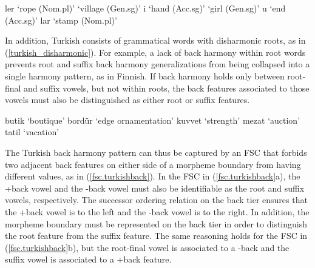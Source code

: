 \documentclass[,doc,floatsintext]{apa6}
\theoremstyle{definition}
\theoremstyle{definition}
\theoremstyle{definition}
\theoremstyle{remark}
\begin{document}
\begin{exe}
\label{turkish_back} 
\begin{xlist}
  \ex {}ler `rope (Nom.pl)'
  \ex {} `village (Gen.sg)'
  \ex {}i   `hand (Acc.sg)'
  \ex {} `girl (Gen.sg)'
  \ex {}u  `end (Acc.sg)'
  \ex {}lar `stamp (Nom.pl)'
\end{xlist}
\end{exe}

In addition, Turkish consists of grammatical words with disharmonic
roots, as in (\ref{turkish_disharmonic}). For example, a lack of back
harmony within root words prevents root and suffix back harmony
generalizations from being collapsed into a single harmony pattern, as
in Finnish. If back harmony holds only between root-final and suffix
vowels, but not within roots, the back features associated to those
vowels must also be distinguished as either root or suffix features.

\begin{exe}
\label{turkish_disharmonic} 
\begin{xlist}
  \ex butik   `boutique'
  \ex bordür  `edge ornamentation'
  \ex kuvvet  `strength'
  \ex mezat   `auction'
  \ex tatil   `vacation'
\end{xlist}
\end{exe}

The Turkish back harmony pattern can thus be captured by an FSC that
forbids two adjacent back features on either side of a morpheme boundary
from having different values, as in (\ref{fsc.turkishback}). In the FSC
in (\ref{fsc.turkishback}a), the +back vowel and the -back vowel must
also be identifiable as the root and suffix vowels, respectively. The
successor ordering relation on the back tier ensures that the +back
vowel is to the left and the -back vowel is to the right. In addition,
the morpheme boundary must be represented on the back tier in order to
distinguish the root feature from the suffix feature. The same reasoning
holds for the FSC in (\ref{fsc.turkishback}b), but the root-final vowel
is associated to a -back and the suffix vowel is associated to a +back
feature.

\begin{exe}
\ex \label{fsc.turkishback}
\end{exe}
\end{document}
